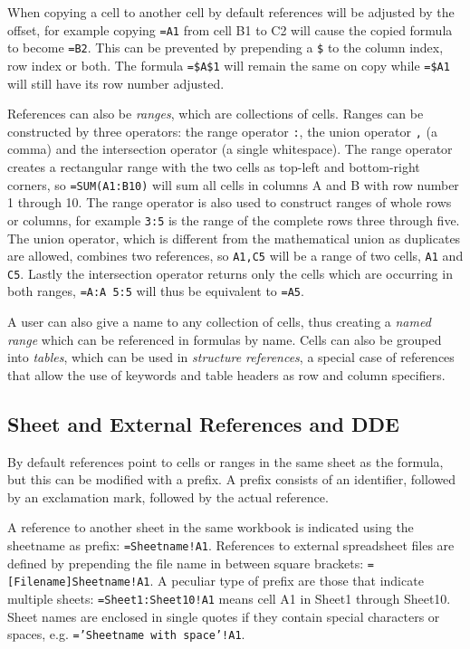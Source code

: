\documentclass[times]{smrauth}
\begin{document}
When copying a cell to another cell by default references will be adjusted by the offset, for example copying \texttt{=A1} from cell B1 to C2 will cause the copied formula to become \texttt{=B2}.
This can be prevented by prepending a \texttt{\$} to the column index, row index or both.
The formula \texttt{=\$A\$1} will remain the same on copy while \texttt{=\$A1} will still have its row number adjusted.

References can also be \emph{ranges}, which are collections of cells.
Ranges can be constructed by three operators: the range operator \texttt{:}, the union operator \texttt{,} (a comma) and the intersection operator \texttt{} (a single whitespace).
The range operator creates a rectangular range with the two cells as top-left and bottom-right corners, so \texttt{=SUM(A1:B10)} will sum all cells in columns A and B with row number 1 through 10.
The range operator is also used to construct ranges of whole rows or columns, for example \texttt{3:5} is the range of the complete rows three through five.
The union operator, which is different from the mathematical union as duplicates are allowed, combines two references, so \texttt{A1,C5} will be a range of two cells, \texttt{A1} and \texttt{C5}.
Lastly the intersection operator returns only the cells which are occurring in both ranges, \texttt{=A:A 5:5} will thus be equivalent to \texttt{=A5}.

A user can also give a name to any collection of cells, thus creating a \emph{named range} which can be referenced in formulas by name. Cells can also be grouped into \emph{tables}, which can be used in \emph{structure references}, a special case of references that allow the use of keywords and table headers as row and column specifiers.

\subsection{Sheet and External References and DDE}
\label{subsection:ExternalRefsDDE}

By default references point to cells or ranges in the same sheet as the formula, but this can be modified with a prefix. A prefix consists of an identifier, followed by an exclamation mark, followed by the actual reference.

A reference to another sheet in the same workbook is indicated using the sheetname as prefix: \texttt{=Sheetname!A1}. References to external spreadsheet files are defined by prepending the file name in between square brackets: \texttt{=[Filename]Sheetname!A1}.
A peculiar type of prefix are those that indicate multiple sheets: \texttt{=Sheet1:Sheet10!A1} means cell A1 in Sheet1 through Sheet10.
Sheet names are enclosed in single quotes if they contain special characters or spaces, e.g. \texttt{='Sheetname with space'!A1}. 
\end{document}
